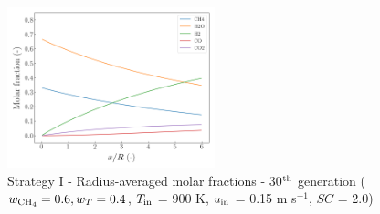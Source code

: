 \documentclass[preprint,12pt]{elsarticle}
\begin{document}
\begin{figure}[h!]
\centering
\includegraphics[width=60mm]{results/5/60C_40T/GEN30-AVG.png}
\caption{\label{fig:5R6040G30-avg} Strategy I - Radius-averaged molar fractions -  30$^{\rm{th}}$ generation ($w_{\rm{CH_4}} = 0.6, w_T = 0.4$, $T_{\rm{in}}$ = 900 K, $u_{\rm{in}}$ = 0.15 m s$^{-1}$, $SC$ = 2.0)}
\end{figure}
\end{document}
